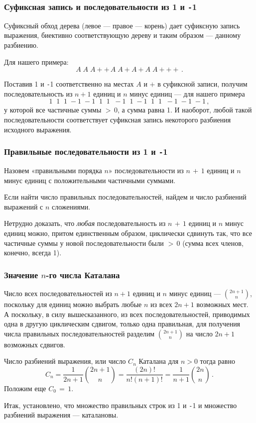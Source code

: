 \documentclass[mathserif]{beamer}
\begin{document}
\begin{frame}[fragile]%
\frametitle{Суфиксная запись и последовательности из 1 и \texttt{-}$\!$1}
Суфиксный обход дерева (левое — правое — корень) дает суфиксную запись выражения, биективно соответствующую дереву и таким образом — данному разбиению.

Для нашего примера:
\[A \; A \; A + + \, A \; A + A + A \; A + + +\,.\]

Поставив 1 и \verb.-.$\!$1 соответственно на местах $A$ и $+$ в суфиксной записи, получим последовательность из $n{+}1$ единиц и $n$ минус единиц — для нашего примера
\[1 \;\; 1 \;\; 1 \; {-}\!1 \; {-}\!1 \;\; 1 \;\; 1 \;\; {-}\!1 \;\; 1 \; {-}\!1 \;\; 1 \;\; 1 \;\; {-}\!1 \; {-}\!1 \; {-}\!1\,,\]
у которой все частичные суммы ${>}\,0$, а сумма равна 1.
И наоборот, любой такой последовательности соответствует суфиксная запись некоторого разбиения исходного выражения.
\end{frame}

\begin{frame}[fragile]%
\frametitle{Правильные последовательности из 1 и \texttt{-}$\!$1}
Назовем «правильными порядка $n$» последовательности из $n\,{+}\,1$ единиц и $n$ минус единиц с положительными частичными суммами.

\medskip

Если найти число правильных последовательностей, найдем и число разбиений выражений с $n$ сложениями.

\bigskip

Нетрудно доказать, что \emph{любая} последовательность из $n\,{+}\,1$ единиц и $n$ минус единиц можно, притом единственным образом, циклически сдвинуть так, что все частичные суммы у новой последовательности были ${>}\,0$ (сумма всех членов, конечно, всегда 1).
\end{frame}

\begin{frame}[fragile]%
\frametitle{Значение $n$-го числа Каталана}
Число всех последовательностей из $n{+}1$ единиц и $n$ минус единиц — ${2n+1\choose n}$, поскольку для единиц можно выбрать любые $n$ из всех $2n{+}1$ возможных мест.
А поскольку, в силу вышесказанного, из всех последовательностей, приводимых одна в другую циклическим сдвигом, только одна правильная, для получения числа правильных последовательностей разделим ${2n+1\choose n}$ на число $2n{+}1$ возможных сдвигов.

\medskip

Число разбиений выражения, или число $C_n$ Каталана для $n{>}0$ тогда равно
\[C_n=\frac1{2n+1}{2n+1\choose n}=\frac{(2n)!}{n!(n+1)!}=\frac1{n+1}{2n\choose n}\,.\]
Положим еще $C_0\,{=}\,1$.

\medskip

Итак, установлено, что множество правильных строк из 1 и \verb.-.$\!$1 и множество разбиений выражения — каталановы.
\end{frame}
\end{document}
